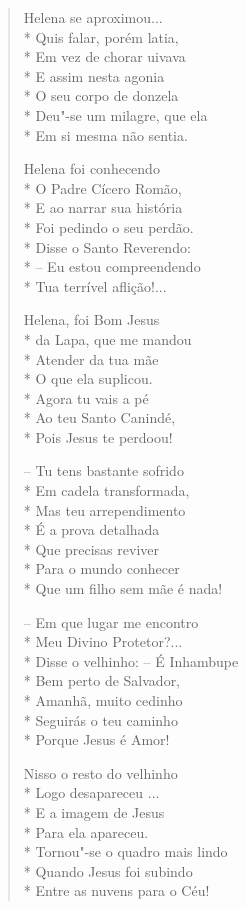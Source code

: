 \begin{verse}
Helena se aproximou...\\*
Quis falar, porém latia,\\*
Em vez de chorar uivava\\*
E assim nesta agonia\\*
O seu corpo de donzela\\*
Deu"-se um milagre, que ela\\*
Em si mesma não sentia.

Helena foi conhecendo\\*
O Padre Cícero Romão,\\*
E ao narrar sua história\\*
Foi pedindo o seu perdão.\\*
Disse o Santo Reverendo:\\*
-- Eu estou compreendendo\\*
Tua terrível aflição!...

Helena, foi Bom Jesus\\*
da Lapa, que me mandou\\*
Atender da tua mãe\\*
O que ela suplicou.\\*
Agora tu vais a pé\\*
Ao teu Santo Canindé,\\*
Pois Jesus te perdoou!

-- Tu tens bastante sofrido\\*
Em cadela transformada,\\*
Mas teu arrependimento\\*
É a prova detalhada\\*
Que precisas reviver\\*
Para o mundo conhecer\\*
Que um filho sem mãe é nada!

-- Em que lugar me encontro\\*
Meu Divino Protetor?...\\*
Disse o velhinho: -- É Inhambupe\\*
Bem perto de Salvador,\\*
Amanhã, muito cedinho\\*
Seguirás o teu caminho\\*
Porque Jesus é Amor!

Nisso o resto do velhinho\\*
Logo desapareceu ...\\*
E a imagem de Jesus\\*
Para ela apareceu.\\*
Tornou"-se o quadro mais lindo\\*
Quando Jesus foi subindo\\*
Entre as nuvens para o Céu!


\end{verse}
